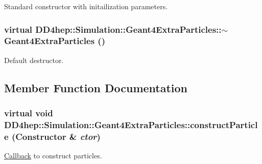 Standard constructor with initailization parameters. \hypertarget{class_d_d4hep_1_1_simulation_1_1_geant4_extra_particles_aca6485d81b22fb87183c62b06da3df17}{
\subsubsection[{$\sim$Geant4ExtraParticles}]{\setlength{\rightskip}{0pt plus 5cm}virtual DD4hep::Simulation::Geant4ExtraParticles::$\sim$Geant4ExtraParticles ()}}
\label{class_d_d4hep_1_1_simulation_1_1_geant4_extra_particles_aca6485d81b22fb87183c62b06da3df17}


Default destructor. 

\subsection{Member Function Documentation}
\hypertarget{class_d_d4hep_1_1_simulation_1_1_geant4_extra_particles_ad256c3419ba5c43c223157434f74ae49}{
\subsubsection[{constructParticle}]{\setlength{\rightskip}{0pt plus 5cm}virtual void DD4hep::Simulation::Geant4ExtraParticles::constructParticle ({\bf Constructor} \& {\em ctor})}}
\label{class_d_d4hep_1_1_simulation_1_1_geant4_extra_particles_ad256c3419ba5c43c223157434f74ae49}


\hyperlink{class_d_d4hep_1_1_callback}{Callback} to construct particles. 

